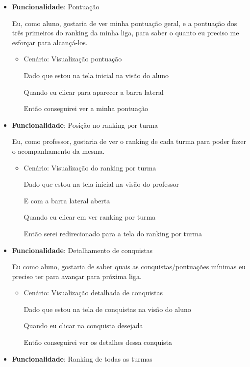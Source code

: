 \documentclass[
    12pt,               %
    openright,          %
    oneside,
    a4paper,            %
    english,            %
    brazil              %
    ]{ifsp-spo-inf-ctds} %
\begin{document}
\begin{itemize}
\item\textbf{Funcionalidade}: Pontuação
    
    Eu, como aluno, gostaria de ver minha pontuação geral, e a pontuação dos três primeiros do ranking da minha liga, para saber o quanto eu preciso me esforçar para alcançá-los.
    \begin{itemize}
        \item Cenário: Visualização pontuação
        \par Dado que estou na tela inicial na visão do aluno
        \par Quando eu clicar para aparecer a barra lateral
        \par Então conseguirei ver a minha pontuação
    \end{itemize}  
 
\item\textbf{Funcionalidade}: Posição no ranking por turma
    
    Eu, como professor, gostaria de ver o ranking de cada turma para poder fazer o acompanhamento da mesma.
    \begin{itemize}
        \item Cenário: Visualização do ranking por turma
        \par Dado que estou na tela inicial na visão do professor
        \par E com a barra lateral aberta
        \par Quando eu clicar em ver ranking por turma
        \par Então serei redirecionado para a tela do ranking por turma
    \end{itemize}  

\item\textbf{Funcionalidade}: Detalhamento de conquistas
    
    Eu como aluno, gostaria de saber quais as conquistas/pontuações mínimas eu preciso ter para avançar para próxima liga.
    \begin{itemize}
        \item Cenário: Visualização detalhada de conquistas  
        \par Dado que estou na tela de conquistas na visão do aluno
        \par Quando eu clicar na conquista desejada
        \par Então conseguirei ver os detalhes dessa conquista
    \end{itemize}  

\item\textbf{Funcionalidade}: Ranking de todas as turmas
    

\end{itemize}
\end{document}
